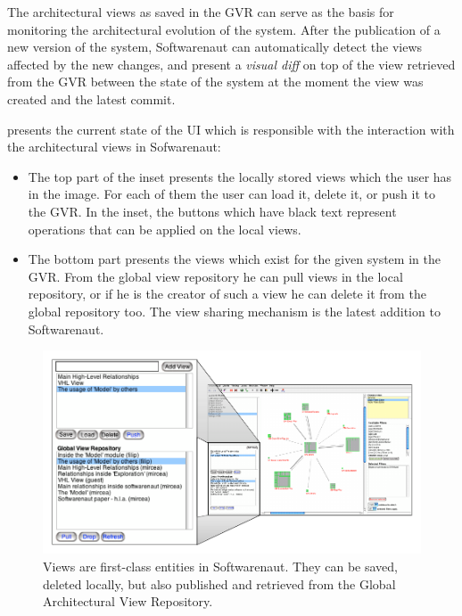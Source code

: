 \documentclass[preprint,12pt]{elsarticle}
\begin{document}
The architectural views as saved in the GVR can serve as the basis for monitoring the architectural evolution of the system. After the publication of a new version of the system, Softwarenaut can automatically detect the views affected by the new changes, and present a {\em visual diff} on top of the view retrieved from the GVR between the state of the system at the moment the view was created and the latest commit.



 presents the current state of the UI which is responsible with the interaction with the architectural views in Sofwarenaut: 

\begin{itemize}


\item The top part of the inset presents the locally stored views which the user has in the image. For each of them the user can load it, delete it, or push it to the GVR. In the inset, the buttons which have black text represent operations that can be applied on the local views.

\item The bottom part presents the views which exist for the given system in the GVR. From the global view repository he can pull views in the local repository, or if he is the creator of such a view he can delete it from the global repository too. The view sharing mechanism is the latest addition to Softwarenaut.
\end{itemize}


\begin{figure}[h]
\begin{center}
\includegraphics[width=\linewidth]{ViewOperations}
\caption{Views are first-class entities in Softwarenaut. They can be saved, deleted locally, but also published and retrieved from the Global Architectural View Repository.}
\end{center}
\end{figure}
\end{document}
